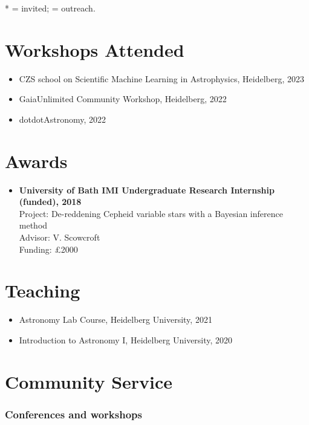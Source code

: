 \documentclass[12pt, letterpaper]{hunt-cv}
\begin{document}
* = invited; \cross = outreach.

\section*{Workshops Attended}

\begin{itemize}
    \item CZS school on Scientific Machine Learning in Astrophysics, Heidelberg, 2023
    \item GaiaUnlimited Community Workshop, Heidelberg, 2022
    \item dotdotAstronomy, 2022
\end{itemize}


\section*{Awards}

\begin{itemize}
    \item \textbf{University of Bath IMI Undergraduate Research Internship (funded), 2018}\\
    Project: De-reddening Cepheid variable stars with a Bayesian inference method\\
    Advisor: V. Scowcroft\\
    Funding: £2000
\end{itemize}


\section*{Teaching}

\begin{itemize}
    \item Astronomy Lab Course, Heidelberg University, 2021
    \item Introduction to Astronomy I, Heidelberg University, 2020
\end{itemize}


\section*{Community Service}

\subsubsection*{Conferences and workshops}
\end{document}
